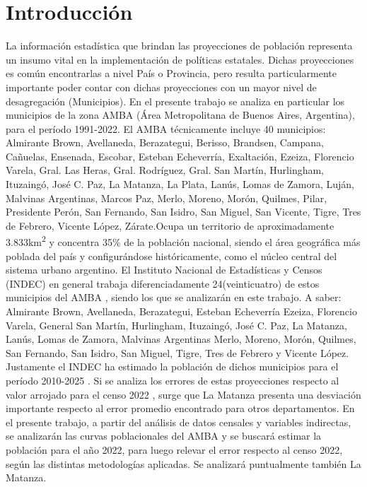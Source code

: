 \documentclass{article}
\theoremstyle{mytheoremstyle}
\theoremstyle{mytheoremstyle}
\theoremstyle{myproblemstyle}
\begin{document}
\section{Introducción}
La información estadística que brindan las proyecciones de población representa un insumo vital en la implementación de 
políticas estatales. Dichas proyecciones es común encontrarlas a nivel País o Provincia, 
pero resulta particularmente importante poder contar con dichas proyecciones con un mayor nivel de desagregación (Municipios).
En el presente trabajo se analiza en particular los municipios de la zona AMBA (Área Metropolitana de Buenos Aires, Argentina),
 para el período 1991-2022. El AMBA técnicamente incluye 40 municipios: Almirante Brown, Avellaneda, Berazategui, Berisso, 
 Brandsen, Campana, Cañuelas, Ensenada, Escobar, Esteban Echeverría, Exaltación, Ezeiza, 
 Florencio Varela, Gral. Las Heras, Gral. Rodríguez, Gral. San Martín, Hurlingham, Ituzaingó, José C. Paz, 
 La Matanza, La Plata, Lanús, Lomas de Zamora, Luján, Malvinas Argentinas, Marcos Paz, Merlo, Moreno, Morón, 
 Quilmes, Pilar, Presidente Perón, San Fernando, San Isidro, San Miguel, San Vicente, Tigre, Tres de Febrero, 
 Vicente López, Zárate.Ocupa un territorio de aproximadamente 3.833\textup{km\textsuperscript{2}} y concentra 35\% de la población nacional, 
 siendo el área geográfica más poblada del país y configurándose históricamente, 
 como el núcleo central del sistema urbano argentino.\newline\newline
 El Instituto Nacional de Estadísticas y Censos (INDEC) en general trabaja diferenciadamente 24(veinticuatro) de estos municipios del AMBA ,
 siendo los que se analizarán en este trabajo. A saber: Almirante Brown, Avellaneda, Berazategui, Esteban Echeverría
 Ezeiza, Florencio Varela, General San Martín, Hurlingham, Ituzaingó, José C. Paz, La Matanza, Lanús, Lomas de Zamora, Malvinas Argentinas
 Merlo, Moreno, Morón, Quilmes, San Fernando, San Isidro, San Miguel, Tigre, Tres de Febrero y Vicente López.\newline\newline
 Justamente el INDEC ha estimado la población de dichos municipios para el período 2010-2025 .
 Si se analiza los errores de estas proyecciones respecto al valor arrojado para el censo 2022  , surge 
 que La Matanza presenta una desviación importante respecto
al error promedio encontrado para otros departamentos.\newline\newline 
 En el presente trabajo, a partir del análisis de datos censales y variables indirectas, se analizarán las curvas poblacionales del AMBA y
 se buscará estimar la población para el año 2022, para luego relevar el error respecto al censo 2022, según 
 las distintas metodologías aplicadas. Se analizará puntualmente también La Matanza.
\end{document}
